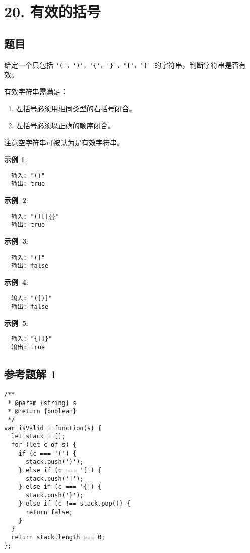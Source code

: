 \newpage
\section{20. 有效的括号}
\label{leetcode:20}

\subsection{题目}

给定一个只包括 \verb|'('，')'，'{'，'}'，'['，']'| 的字符串，判断字符串是否有效。

有效字符串需满足：

\begin{enumerate}
  \item 左括号必须用相同类型的右括号闭合。
  \item 左括号必须以正确的顺序闭合。
\end{enumerate}

注意空字符串可被认为是有效字符串。

\textbf{示例 1}:

\begin{verbatim}
  输入: "()"
  输出: true
\end{verbatim}

\textbf{示例 2}:

\begin{verbatim}
  输入: "()[]{}"
  输出: true
\end{verbatim}

\textbf{示例 3}:

\begin{verbatim}
  输入: "(]"
  输出: false
\end{verbatim}

\textbf{示例 4}:

\begin{verbatim}
  输入: "([)]"
  输出: false
\end{verbatim}

\textbf{示例 5}:

\begin{verbatim}
  输入: "{[]}"
  输出: true
\end{verbatim}

\subsection{参考题解 1}

\begin{verbatim}
/**
 * @param {string} s
 * @return {boolean}
 */
var isValid = function(s) {
  let stack = [];
  for (let c of s) {
    if (c === '(') {
      stack.push(')');
    } else if (c === '[') {
      stack.push(']');
    } else if (c === '{') {
      stack.push('}');
    } else if (c !== stack.pop()) {
      return false;
    }
  }
  return stack.length === 0;
};
\end{verbatim}

